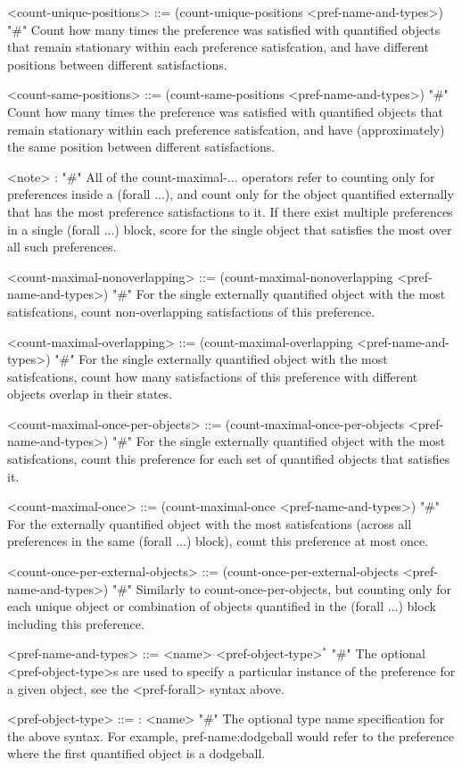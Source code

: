 \documentclass{article}
\begin{document}
\begin{grammar}
<count-unique-positions> ::= (count-unique-positions <pref-name-and-types>) "#" Count how many times the preference was satisfied with quantified objects that remain stationary within each preference satisfcation, and have different positions between different satisfactions.

<count-same-positions> ::= (count-same-positions <pref-name-and-types>) "#" Count how many times the preference was satisfied with quantified objects that remain stationary within each preference satisfcation, and have (approximately) the same position between different satisfactions.

<note> : "#" All of the count-maximal-... operators refer to counting only for preferences inside a (forall ...), and count only for the object quantified externally that has the most preference satisfactions to it. If there exist multiple preferences in a single (forall ...) block, score for the single object that satisfies the most over all such preferences.

<count-maximal-nonoverlapping> ::= (count-maximal-nonoverlapping <pref-name-and-types>) "#" For the single externally quantified object with the most satisfcations, count non-overlapping satisfactions of this preference.

<count-maximal-overlapping> ::= (count-maximal-overlapping <pref-name-and-types>) "#" For the single externally quantified object with the most satisfcations, count how many satisfactions of this preference with different objects overlap in their states.

<count-maximal-once-per-objects> ::= (count-maximal-once-per-objects <pref-name-and-types>) "#" For the single externally quantified object with the most satisfcations, count this preference for each set of quantified objects that satisfies it.

<count-maximal-once> ::= (count-maximal-once <pref-name-and-types>) "#" For the externally quantified object with the most satisfcations (across all preferences in the same (forall ...) block), count this preference at most once.

<count-once-per-external-objects> ::=  (count-once-per-external-objects <pref-name-and-types>) "#" Similarly to count-once-per-objects, but counting only for each unique object or combination of objects quantified in the (forall ...) block including this preference.

<pref-name-and-types> ::= <name> <pref-object-type>$^*$ "#" The optional <pref-object-type>s are used to specify a particular instance of the preference for a given object, see the <pref-forall> syntax above.

    <pref-object-type> ::= : <name>  "#" The optional type name specification for the above syntax. For example, pref-name:dodgeball would refer to the preference where the first quantified object is a dodgeball.
    



\end{grammar}
\end{document}
